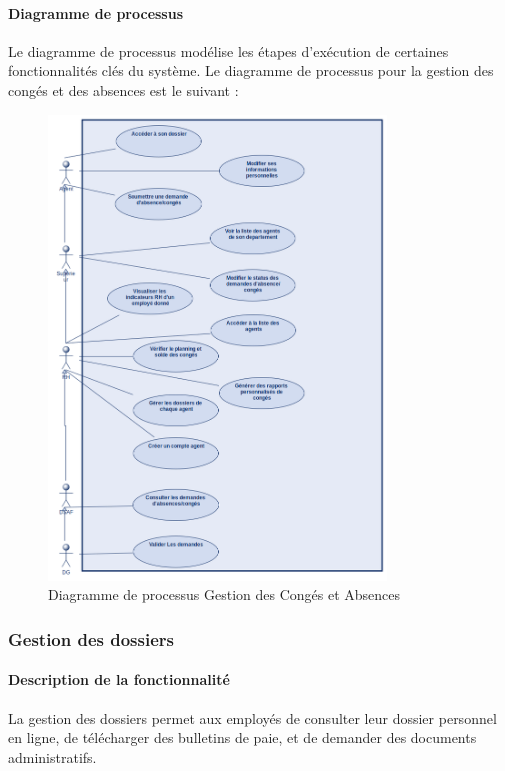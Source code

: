 \paragraph{Diagramme de processus}
Le diagramme de processus modélise les étapes d'exécution de certaines fonctionnalités clés du système. Le diagramme de processus pour la gestion des congés et des absences est le suivant :
\begin{figure}[H]
    \centering
    \includegraphics[width=0.8\textwidth]{images/diagrammes/flowcharts/conges.png}
    \caption{Diagramme de processus Gestion des Congés et Absences}
    \label{fig:flow_gestion_conges}
\end{figure}

\subsubsection{Gestion des dossiers}
\paragraph{Description de la fonctionnalité}
La gestion des dossiers permet aux employés de consulter leur dossier personnel en ligne, de télécharger des bulletins de paie, et de demander des documents administratifs.
